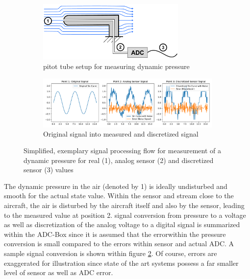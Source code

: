 \begin{figure}[!h]
    \centering
    \begin{subfigure}{\textwidth}
        \centering
        \includegraphics[width=0.8\textwidth]{03_figures/signal_recording}
        \caption{pitot tube setup for measuring dynamic pressure}
        \label{fig:signal_processing_setup}
    \end{subfigure}
    \begin{subfigure}{\textwidth}
        \centering
        \includegraphics[width=\textwidth]{03_figures/python_functions/images/signal_processing_plots}
        \caption{Original signal into measured and discretized signal}
        \label{fig:signal_processing_plots}
    \end{subfigure}
    \caption{Simplified, exemplary signal processing flow for measurement of a dynamic pressure for real (1), analog sensor (2) and discretized sensor (3) values}
    \label{fig:signal_processing}
\end{figure}


The dynamic pressure in the air (denoted by 1) is ideally undisturbed and smooth for the actual state value. Within the sensor and stream close to the aircraft, the air is disturbed by the aircraft itself and also by the sensor, leading to the measured value at position 2. signal conversion from pressure to a voltage as well as discretization of the analog voltage to a digital signal is summarized within the ADC-Box since it is assumed that the errorwithin the pressure conversion is small compared to the errors within sensor and actual ADC. A sample signal conversion is shown within figure \ref{fig:signal_processing_plots}. Of course, errors are exaggerated for illustration since state of the art systems possess a far smaller level of sensor as well as ADC error.


